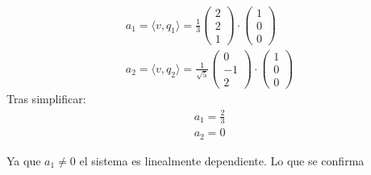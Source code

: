 \documentclass[a4paper,spanish]{article}
\begin{document}
\begin{align*}
    a_1 = \langle v, q_1 \rangle = \frac{1}{3}\left(\begin{matrix}2 \\2\\1\end{matrix}\right) \cdot \left(\begin{matrix}1\\0\\0\end{matrix}\right) \\
    a_2 = \langle v, q_2 \rangle = \frac{1}{\sqrt{5}} \left(\begin{matrix}0 \\-1\\2\end{matrix}\right) \cdot \left(\begin{matrix}1\\0\\0\end{matrix}\right)
\end{align*}
Tras simplificar:
\begin{align*}
    a_1 =  \frac{2}{3} \\
    a_2 = 0
\end{align*}

Ya que  $a_1 \neq 0$ el sistema es linealmente dependiente. Lo que se confirma
\end{document}
